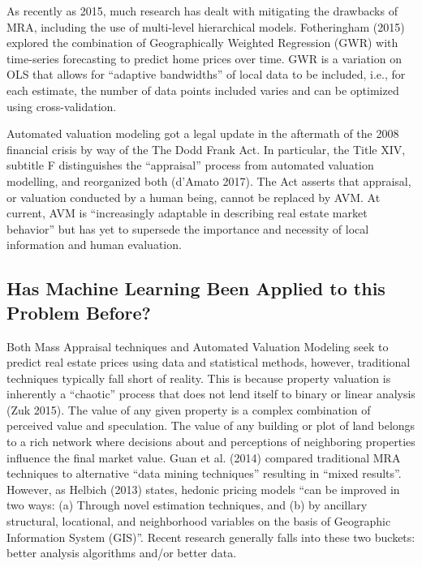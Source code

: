 \documentclass[12pt,]{article}
\begin{document}
As recently as 2015, much research has dealt with mitigating the
drawbacks of MRA, including the use of multi-level hierarchical models.
Fotheringham (2015) explored the combination of Geographically Weighted
Regression (GWR) with time-series forecasting to predict home prices
over time. GWR is a variation on OLS that allows for ``adaptive
bandwidths'' of local data to be included, i.e., for each estimate, the
number of data points included varies and can be optimized using
cross-validation.

Automated valuation modeling got a legal update in the aftermath of the
2008 financial crisis by way of the The Dodd Frank Act. In particular,
the Title XIV, subtitle F distinguishes the ``appraisal'' process from
automated valuation modelling, and reorganized both (d'Amato 2017). The
Act asserts that appraisal, or valuation conducted by a human being,
cannot be replaced by AVM. At current, AVM is ``increasingly adaptable
in describing real estate market behavior'' but has yet to supersede the
importance and necessity of local information and human evaluation.

\subsection{Has Machine Learning Been Applied to this Problem
Before?}\label{has-machine-learning-been-applied-to-this-problem-before}

Both Mass Appraisal techniques and Automated Valuation Modeling seek to
predict real estate prices using data and statistical methods, however,
traditional techniques typically fall short of reality. This is because
property valuation is inherently a ``chaotic'' process that does not
lend itself to binary or linear analysis (Zuk 2015). The value of any
given property is a complex combination of perceived value and
speculation. The value of any building or plot of land belongs to a rich
network where decisions about and perceptions of neighboring properties
influence the final market value. Guan et al. (2014) compared
traditional MRA techniques to alternative ``data mining techniques''
resulting in ``mixed results''. However, as Helbich (2013) states,
hedonic pricing models ``can be improved in two ways: (a) Through novel
estimation techniques, and (b) by ancillary structural, locational, and
neighborhood variables on the basis of Geographic Information System
(GIS)''. Recent research generally falls into these two buckets: better
analysis algorithms and/or better data.
\end{document}
